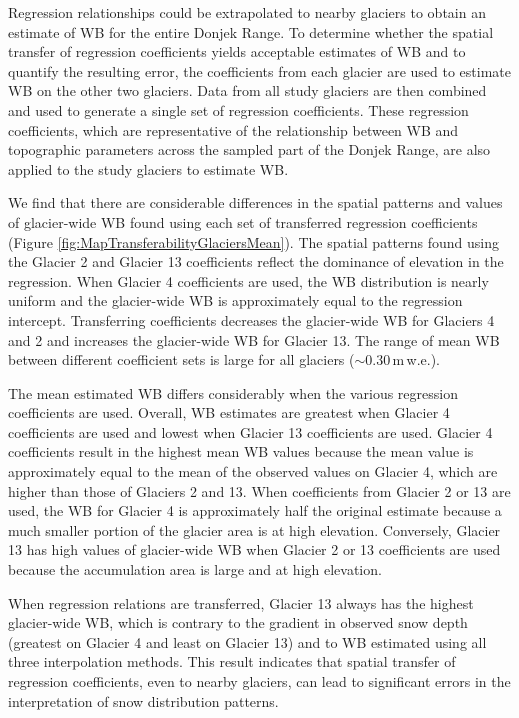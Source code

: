 \documentclass{sfuthesis}
\begin{document}
Regression relationships could be extrapolated to nearby glaciers to obtain an estimate of WB for the entire Donjek Range. To determine whether the spatial transfer of regression coefficients yields acceptable estimates of WB and to quantify the resulting error, the coefficients from each glacier are used to estimate WB on the other two glaciers. Data from all study glaciers are then combined and used to generate a single set of regression coefficients. These regression coefficients, which are representative of the relationship between WB and topographic parameters across the sampled part of the Donjek Range, are also applied to the study glaciers to estimate WB.

We find that there are considerable differences in the spatial patterns and values of glacier-wide WB found using each set of transferred regression coefficients (Figure \ref{fig:MapTransferabilityGlaciersMean}). The spatial patterns found using the Glacier 2 and Glacier 13 coefficients reflect the dominance of elevation in the regression. When Glacier 4 coefficients are used, the WB distribution is nearly uniform and the glacier-wide WB is approximately equal to the regression intercept. Transferring coefficients decreases the glacier-wide WB for Glaciers 4 and 2 and increases the glacier-wide WB for Glacier 13. The range of mean WB between different coefficient sets is large for all glaciers ($\sim$0.30\,m\,w.e.). 

The mean estimated WB differs considerably when the various regression coefficients are used. Overall, WB estimates are greatest when Glacier 4 coefficients are used and lowest when Glacier 13 coefficients are used. Glacier 4 coefficients result in the highest mean WB values because the mean value is approximately equal to the mean of the observed values on Glacier 4, which are higher than those of Glaciers 2 and 13. When coefficients from Glacier 2 or 13 are used, the WB for Glacier 4 is approximately half the original estimate because a much smaller portion of the glacier area is at high elevation. Conversely, Glacier 13 has high values of glacier-wide WB when Glacier 2 or 13 coefficients are used because the accumulation area is large and at high elevation. 

When regression relations are transferred, Glacier 13 always has the highest glacier-wide WB, which is contrary to the gradient in observed snow depth (greatest on Glacier 4 and least on Glacier 13) and to WB estimated using all three interpolation methods. This result indicates that spatial transfer of regression coefficients, even to nearby glaciers, can lead to significant errors in the interpretation of snow distribution patterns.
\end{document}
